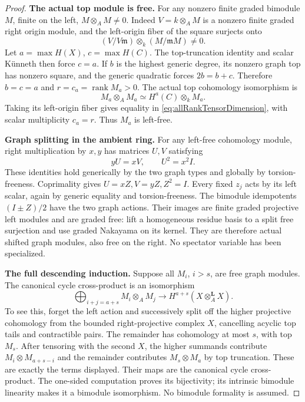 \begin{proof}
\par\smallskip\noindent\textbf{The actual top module is free.}\quad
For any nonzero finite graded bimodule \(M\), finite
on the left, \(M\otimes_AM\ne0\).
Indeed \(V=k\otimes_AM\) is a nonzero finite graded
right origin module, and the left-origin fiber
of the square surjects onto
\[
 (V/V\mathfrak m)\otimes_k(M/\mathfrak mM)\ne0.
\]
Let \(a=\max H(X)\), \(c=\max H(C)\).
The top-truncation identity and scalar K\"unneth
then force \(c=a\). If \(b\) is the highest generic
degree, its nonzero graph top has nonzero square,
and the generic quadratic forces \(2b=b+c\).
Therefore \(b=c=a\) and \(r=c_a=\operatorname{rank}M_a>0\).
The actual top cohomology isomorphism is
\[
 M_a\otimes_AM_a\simeq H^a(C)\otimes_kM_a.
\]
Taking its left-origin fiber gives equality in
\eqref{eq:allRankTensorDimension}, with scalar
multiplicity \(c_a=r\). Thus \(M_a\) is left-free.

\par\smallskip\noindent\textbf{Graph splitting in the ambient ring.}\quad
For any left-free cohomology module, right multiplication
by \(x,y\) has matrices \(U,V\) satisfying
\[
                         yU=xV,\qquad U^2=x^2I.
\]
These identities hold generically by the two graph
types and globally by torsion-freeness.
Coprimality gives \(U=xZ,V=yZ,Z^2=I\).
Every fixed \(z_j\) acts by its left scalar, again
by generic equality and torsion-freeness.
The bimodule idempotents \((I\pm Z)/2\) have
the two graph actions. Their images are finite
graded projective left modules and are graded free:
lift a homogeneous residue basis to a split free
surjection and use graded Nakayama on its kernel.
They are therefore actual shifted graph modules,
also free on the right.
No spectator variable has been specialized.

\par\smallskip\noindent\textbf{The full descending induction.}\quad
Suppose all \(M_i\), \(i>s\), are free graph modules.
The canonical cycle cross-product is an isomorphism
\begin{equation}\label{eq:allRankNearTopKunneth}
 \bigoplus_{i+j=a+s}M_i\otimes_AM_j
       \longrightarrow H^{a+s}(X\otimes_A^{\mathbf L}X).
\end{equation}
To see this, forget the left action and successively
split off the higher projective cohomology from the
bounded right-projective complex \(X\), cancelling
acyclic top tails and contractible pairs. The remainder
has cohomology at most \(s\), with top \(M_s\).
After tensoring with the second \(X\), the higher
summands contribute \(M_i\otimes M_{a+s-i}\) and
the remainder contributes \(M_s\otimes M_a\) by
top truncation. These are exactly the terms displayed.
Their maps are the canonical cycle cross-product.
The one-sided computation proves its bijectivity;
its intrinsic bimodule linearity makes it a bimodule
isomorphism. No bimodule formality is assumed.


\end{proof}
